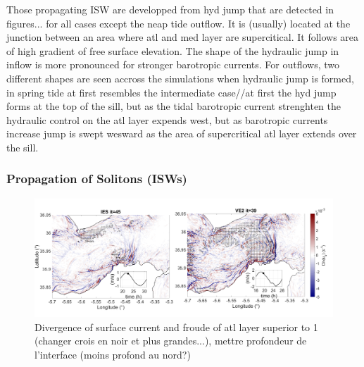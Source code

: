 Those propagating ISW are developped from hyd jump that are detected in figures... for all cases except the neap tide outflow. It is (usually) located at the junction between an area where atl and med layer are supercitical. It follows area of high gradient of free surface elevation. The shape of the hydraulic jump in inflow is more pronounced for stronger barotropic currents. For outflows, two different shapes are seen accross the simulations when hydraulic jump is formed, in spring tide at first resembles the intermediate case//at first the hyd jump forms at the top of the sill, but as the tidal barotropic current strenghten the hydraulic control on the atl layer expends west, but as barotropic currents increase jump is swept wesward as the area of supercritical atl layer extends over the sill.




\subsubsection{Propagation of Solitons (ISWs)}

\begin{figure}[!h]
 \centering
\includegraphics[width=\linewidth]{./GBR3D/FigWaveCont.png}
 \caption {Divergence of surface current and froude of atl layer superior to 1 (changer crois en noir et plus grandes...), mettre profondeur de l'interface (moins profond au nord?)}
 \label{FigISWGBR3D}
\end{figure}



